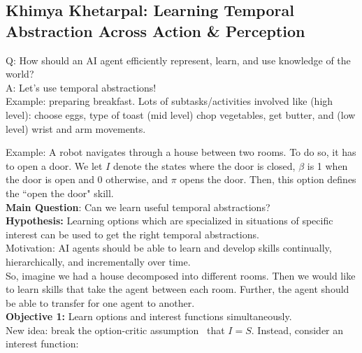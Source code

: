 \spacerule
\subsection{Khimya Khetarpal: Learning Temporal Abstraction Across Action \& Perception}

Q: How should an AI agent efficiently represent, learn, and use knowledge of the world? \\

A: Let's use temporal abstractions! \\

Example: preparing breakfast. Lots of subtasks/activities involved like (high level): choose eggs, type of toast (mid level) chop vegetables, get butter, and (low level) wrist and arm movements. \\


Example: A robot navigates through a house between two rooms. To do so, it has to open a door. We let $I$ denote the states where the door is closed, $\beta$ is 1 when the door is open and 0 otherwise, and $\pi$ opens the door. Then, this option defines the ``open the door" skill. \\

{\bf Main Question}: Can we learn useful temporal abstractions? \\

{\bf Hypothesis:} Learning options which are specialized in situations of specific interest can be used to get the right temporal abstractions. \\

Motivation: AI agents should be able to learn and develop skills continually, hierarchically, and incrementally over time. \\

So, imagine we had a house decomposed into different rooms. Then we would like to learn skills that take the agent between each room. Further, the agent should be able to transfer for one agent to another. \\

{\bf Objective 1:} Learn options and interest functions simultaneously. \\

New idea: break the option-critic assumption~\cite{bacon2017option} that $I = S$. Instead, consider an interest function:

